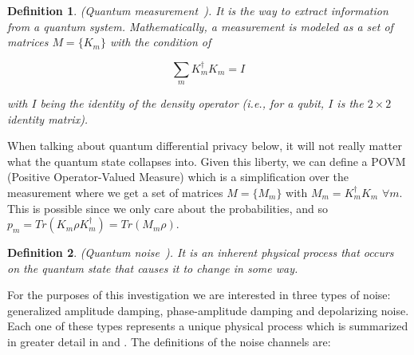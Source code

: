 \documentclass{ieeeaccess}
\newtheorem{definition}{Definition}[section]
\begin{document}
\begin{definition}
    (Quantum measurement~\cite{zhou2017differential}). It is the way to extract information from a quantum system. Mathematically, a measurement is modeled as a set of matrices $M = \{K_m\}$ with the condition of

    \[
      \sum_m K^{\dagger}_{m}K_{m} = I
    \]

    with $I$ being the identity of the density operator (i.e., for a qubit, $I$ is the $2\times2$ identity matrix).
    \label{def:quantum_measurement}
\end{definition}

When talking about quantum differential privacy below, it will not really matter what the quantum state collapses into. Given this liberty, we can define a POVM (Positive Operator-Valued Measure) which is a simplification over the measurement where we get a set of matrices $M = \{M_m\}$ with $M_m = K^{\dagger}_{m}K_{m}$ $\forall m$. This is possible since we only care about the probabilities, and so $p_m = Tr(K_{m} \rho K^{\dagger}_{m}) = Tr(M_m\rho)$.

\begin{definition}
    (Quantum noise~\cite{zhou2017differential}). It is an inherent physical process that occurs on the quantum state that causes it to change in some way.
    \label{def:quantum_noise}
\end{definition}

For the purposes of this investigation we are interested in three types of noise: generalized amplitude damping, phase-amplitude damping and depolarizing noise. Each one of these types represents a unique physical process which is summarized in greater detail in \cite{song2025hybrid} and \cite{zhou2017differential}. The definitions of the noise channels are:
\end{document}

